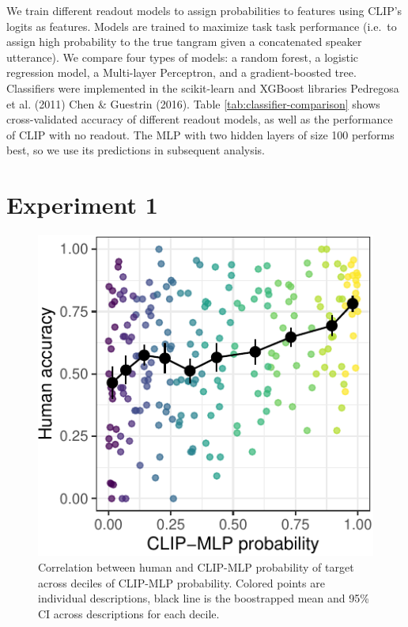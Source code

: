 \documentclass[10pt, letterpaper]{article}
\begin{document}
We train different readout models to assign probabilities to features
using CLIP's logits as features. Models are trained to maximize task
task performance (i.e.~to assign high probability to the true tangram
given a concatenated speaker utterance). We compare four types of
models: a random forest, a logistic regression model, a Multi-layer
Perceptron, and a gradient-boosted tree. Classifiers were implemented in
the scikit-learn and XGBoost libraries Pedregosa et al. (2011) Chen \&
Guestrin (2016). Table \ref{tab:classifier-comparison} shows
cross-validated accuracy of different readout models, as well as the
performance of CLIP with no readout. The MLP with two hidden layers of
size 100 performs best, so we use its predictions in subsequent
analysis.

\section{Experiment 1}\label{experiment-1}

\begin{CodeChunk}
\begin{figure}[t]

{\centering \includegraphics[width=0.7\linewidth]{figs/fig-calibration-1} 

}

\caption[Correlation between human and CLIP-MLP probability of target across deciles of CLIP-MLP probability]{Correlation between human and CLIP-MLP probability of target across deciles of CLIP-MLP probability. Colored points are individual descriptions, black line is the boostrapped mean and 95\% CI across descriptions for each decile. \label{calibration}}\label{fig:fig-calibration}
\end{figure}
\end{CodeChunk}
\end{document}

